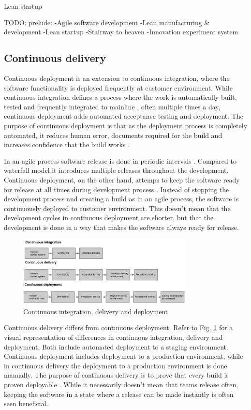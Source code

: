 \documentclass[english]{tktltiki2}
\theoremstyle{definition}
\theoremstyle{remark}
\begin{document}
Lean startup  

TODO: prelude:
-Agile software development
-Lean manufacturing & development
-Lean startup
-Stairway to heaven
-Innovation experiment system

\subsection{Continuous delivery}
Continuous deployment is an extension to continuous integration, where the software functionality is deployed frequently at customer environment. While continuous integration defines a process where the work is automatically built, tested and frequently integrated to mainline \cite{fowler2006continuous}, often multiple times a day, continuous deployment adds automated acceptance testing and deployment. The purpose of continuous deployment is that as the deployment process is completely automated, it reduces human error, documents required for the build and increases confidence that the build works \cite{cdbook}. 

In an agile process software release is done in periodic intervals \cite{cockburn2002agile}. Compared to waterfall model it introduces multiple releases throughout the development. Continuous deployment, on the other hand, attemps to keep the software ready for release at all times during development process \cite{cdbook}. Instead of stopping the development process and creating a build as in an agile process, the software is continuously deployed to customer environment. This doesn't mean that the development cycles in continuous deployment are shorter, but that the development is done in a way that makes the software always ready for release.
\begin{figure}[!t]
	\centering
	\includegraphics[width=3.5in]{rtvd.jpg}
	\caption{Continuous integration, delivery and deployment}
	\label{fig1}
\end{figure}
Continuous delivery differs from continuous deployment. Refer to Fig. \ref{fig1} for a visual representation of differences in continuous integration, delivery and deployment. Both include automated deployment to a staging environment. Continuous deployment includes deployment to a production environment, while in continuous delivery the deployment to a production environment is done manually. The purpose of continuous delivery is to prove that every build is proven deployable \cite{cdbook}. While it necessarily doesn't mean that teams release often, keeping the software in a state where a release can be made instantly is often seen beneficial.
\end{document}
